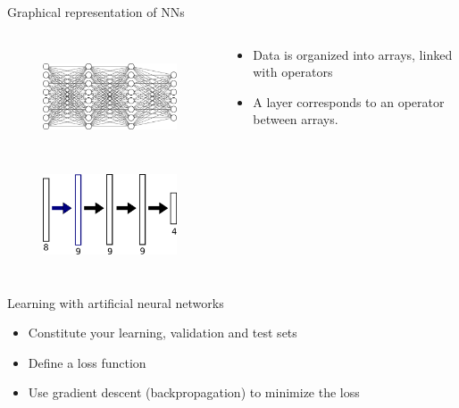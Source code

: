 \documentclass[xcolor=pdftex,dvipsnames,table,mathserif]{beamer}
\begin{document}
\begin{frame}{Graphical representation of NNs}

\begin{columns}
  \begin{column}{.5\textwidth}
    \begin{figure}
      \includegraphics[height=3cm]{mini_reseau3_bis.png}
    \end{figure}
    \begin{figure}
      \includegraphics[height=3cm]{nn_representation}
    \end{figure}
  \end{column}

  \begin{column}{.5\textwidth}
    \begin{itemize}
    \item Data is organized into arrays, linked with operators
    \item A layer corresponds to an operator between arrays.
    \end{itemize}
  \end{column}
\end{columns}

\end{frame}


\begin{frame}{Learning with artificial neural networks}

\begin{itemize}
\item Constitute your learning, validation and test sets
\item Define a loss function
\item Use gradient descent (backpropagation) to minimize the loss
\end{itemize}

\end{frame}
\end{document}
